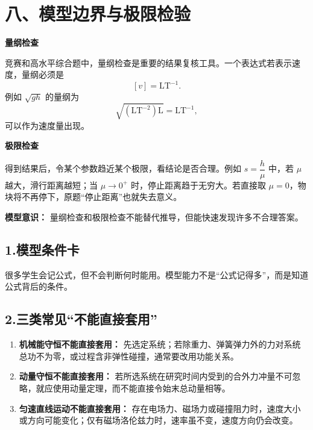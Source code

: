 \section*{八、模型边界与极限检验}
\begin{competitionbox}
\textbf{量纲检查}

竞赛和高水平综合题中，量纲检查是重要的结果复核工具。一个表达式若表示速度，量纲必须是
\[
[v]=\mathrm{L}\mathrm{T}^{-1}.
\]
例如 $\sqrt{gh}$ 的量纲为
\[
\sqrt{(\mathrm{L}\mathrm{T}^{-2})\mathrm{L}}=\mathrm{L}\mathrm{T}^{-1},
\]
可以作为速度量出现。

\textbf{极限检查}

得到结果后，令某个参数趋近某个极限，看结论是否合理。例如 $s=\dfrac{h}{\mu}$ 中，若 $\mu$ 越大，滑行距离越短；当 $\mu\rightarrow0^+$ 时，停止距离趋于无穷大。若直接取 $\mu=0$，物块将不再停下，原题“停止距离”也就失去意义。

\textbf{模型意识：} 量纲检查和极限检查不能替代推导，但能快速发现许多不合理答案。
\end{competitionbox}

\subsection*{1.\quad 模型条件卡}

很多学生会记公式，但不会判断何时能用。模型能力不是“公式记得多”，而是知道公式背后的条件。

\begin{center}


\label{fig:model-conditions-card}
\end{center}

\subsection*{2.\quad 三类常见“不能直接套用”}

\begin{enumerate}
  \item \textbf{机械能守恒不能直接套用：} 先选定系统；若除重力、弹簧弹力外的力对系统总功不为零，或过程含非弹性碰撞，通常要改用功能关系。
  \item \textbf{动量守恒不能直接套用：} 若所选系统在研究时间内受到的合外力冲量不可忽略，就应使用动量定理，而不能直接令始末总动量相等。
  \item \textbf{匀速直线运动不能直接套用：} 存在电场力、磁场力或碰撞阻力时，速度大小或方向可能变化；仅有磁场洛伦兹力时，速率虽不变，速度方向仍会改变。
\end{enumerate}

